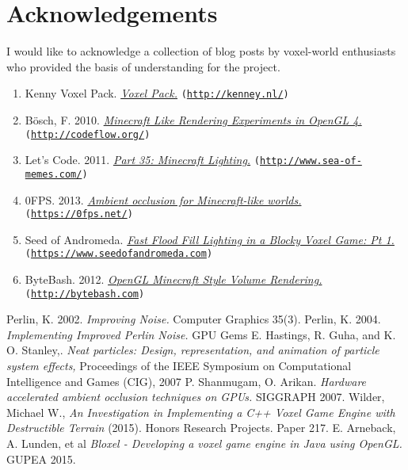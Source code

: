 \documentclass{book}
\begin{document}
\section{Acknowledgements}
I would like to acknowledge a collection of blog posts by voxel-world enthusiasts who provided the basis of understanding for the project.

\begin{enumerate}
	\item Kenny Voxel Pack. {\em \href{http://kenney.nl/assets/voxel-pack}{Voxel Pack.}} \texttt{(\url{http://kenney.nl/})}
	\item Bösch, F. 2010. {\em \href{http://codeflow.org/entries/2010/dec/09/minecraft-like-rendering-experiments-in-opengl-4/#ambient-occlusion}{Minecraft Like Rendering Experiments in OpenGL 4.}} \texttt{(\url{http://codeflow.org/})}
	\item Let's Code. 2011. {\em \href{http://www.sea-of-memes.com/LetsCode35/LetsCode35.html}{Part 35: Minecraft Lighting.}} \texttt{(\url{http://www.sea-of-memes.com/})}
	\item 0FPS. 2013. {\em \href{https://0fps.net/2013/07/03/ambient-occlusion-for-minecraft-like-worlds/}{Ambient occlusion for Minecraft-like worlds.}} \texttt{(\url{https://0fps.net/})}
	\item Seed of Andromeda. {\em \href{https://www.seedofandromeda.com/blogs/29-fast-flood-fill-lighting-in-a-blocky-voxel-game-pt-1/}{Fast Flood Fill Lighting in a Blocky Voxel Game: Pt 1.}} \texttt{(\url{https://www.seedofandromeda.com})}
	\item ByteBash. 2012. {\em \href{http://bytebash.com/2012/03/opengl-volume-rendering/}{OpenGL Minecraft Style Volume Rendering.}} \texttt{(\url{http://bytebash.com})}
\end{enumerate}


\nocite{*}
\begin{thebibliography}{1}
	    
	 Perlin, K. 2002. {\em Improving Noise.} Computer Graphics 35(3).
	  Perlin, K. 2004. {\em Implementing Improved Perlin Noise.} GPU Gems
	  E. Hastings, R. Guha, and K. O. Stanley,. {\em Neat particles: Design, representation, and animation of particle system effects,} Proceedings of the IEEE Symposium on Computational Intelligence and Games (CIG), 2007
	 P. Shanmugam, O. Arikan. {\em Hardware accelerated ambient occlusion techniques on GPUs. }  SIGGRAPH 2007.
	  Wilder, Michael W., {\em An Investigation in Implementing a C++ Voxel Game Engine with Destructible Terrain } (2015). Honors Research Projects. Paper 217.
	 E. Arneback, A. Lunden, et al {\em Bloxel - Developing a voxel game engine in Java using OpenGL. } GUPEA 2015.
\end{thebibliography}

\clearpage
\end{document}
